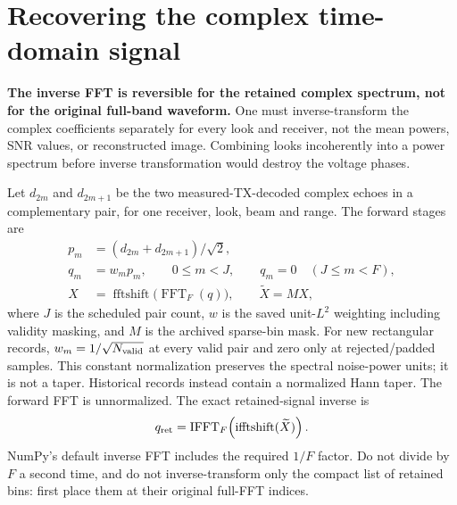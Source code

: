 \documentclass[11pt]{article}
\begin{document}
\clearpage
\section{Recovering the complex time-domain signal}
\label{sec:inverse}

\textbf{The inverse FFT is reversible for the retained complex spectrum, not
for the original full-band waveform.} One must inverse-transform the complex
coefficients separately for every look and receiver, not the mean powers,
SNR values, or reconstructed image. Combining looks incoherently into a power
spectrum before inverse transformation would destroy the voltage phases.

Let $d_{2m}$ and $d_{2m+1}$ be the two measured-TX-decoded complex echoes in a
complementary pair, for one receiver, look, beam and range. The forward stages
are
\begin{align}
 p_m &= (d_{2m}+d_{2m+1})/\sqrt{2},\\
 q_m &= w_m p_m,\qquad 0\le m<J,
 \qquad q_m=0\quad(J\le m<F),\\
 X &= \operatorname{fftshift}\bigl(\operatorname{FFT}_F(q)\bigr),
 \qquad \widetilde X=M X,
\end{align}
where $J$ is the scheduled pair count, $w$ is the saved unit-$L^2$ weighting
including validity masking, and $M$ is the archived sparse-bin mask.
For new rectangular records, $w_m=1/\sqrt{N_{\rm valid}}$ at every valid pair
and zero only at rejected/padded samples. This constant normalization preserves
the spectral noise-power units; it is not a taper. Historical records instead
contain a normalized Hann taper.
The forward FFT is unnormalized. The exact retained-signal inverse is
\begin{equation}
 q_{\rm ret}=\operatorname{IFFT}_F\!\left(
        \operatorname{ifftshift}(\widetilde X)\right).
 \label{eq:inverse}
\end{equation}
NumPy's default inverse FFT includes the required $1/F$ factor. Do not divide
by $F$ a second time, and do not inverse-transform only the compact list of
retained bins: first place them at their original full-FFT indices.
\end{document}
